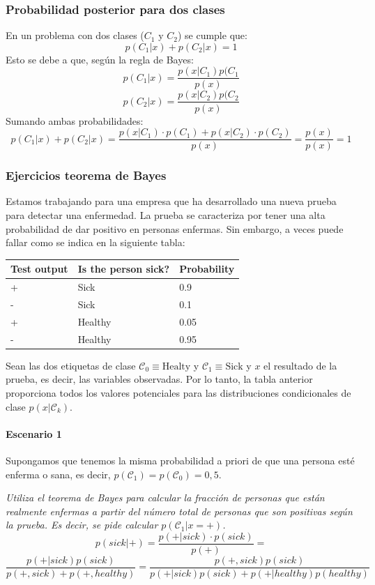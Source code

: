 \subsubsection{Probabilidad posterior para dos clases}
En un problema con dos clases ($C_1$ y $C_2$) se cumple que:
$$p(C_1|x) + p(C_2|x) = 1$$
Esto se debe a que, según la regla de Bayes:
$$p(C_1|x) = \frac{p(x|C_1) p(C_1}{p(x)}$$
$$p(C_2|x) = \frac{p(x|C_2) p(C_2}{p(x)}$$
Sumando ambas probabilidades:
$$p(C_1|x) + p(C_2|x) = \frac{p(x|C_1) \cdot p(C_1) + p(x|C_2) \cdot p(C_2)}{p(x)} = \frac{p(x)}{p(x)} = 1$$

\subsubsection{Ejercicios teorema de Bayes}
Estamos trabajando para una empresa que ha desarrollado una nueva prueba para detectar una enfermedad. La prueba se caracteriza por tener una alta probabilidad de dar positivo en personas enfermas. Sin embargo, a veces puede fallar como se indica en la siguiente tabla:

\begin{table}[h]
    \centering
    \begin{tabular}{|l|l|l|}
    \hline
        Test output & Is the person sick? & Probability \\ \hline
        + & Sick & 0.9 \\ \hline
        - & Sick & 0.1 \\ \hline
        + & Healthy & 0.05 \\ \hline
        - & Healthy & 0.95 \\ \hline
    \end{tabular}
\end{table}

Sean las dos etiquetas de clase $\mathcal{C}_0 \equiv \text{Healty}$ y $\mathcal{C}_1 \equiv \text{Sick}$ y $x$ el resultado de la prueba, es decir, las variables observadas. Por lo tanto, la tabla anterior proporciona todos los valores potenciales para las distribuciones condicionales de clase $p(x|\mathcal{C}_k)$.

\paragraph{Escenario 1} 
Supongamos que tenemos la misma probabilidad a priori de que una persona esté enferma o sana, es decir, $p(\mathcal{C}_1)=p(\mathcal{C}_0)=0,5$. 

\textit{Utiliza el teorema de Bayes para calcular la fracción de personas que están realmente enfermas a partir del número total de personas que son positivas según la prueba. Es decir, se pide calcular $p(\mathcal{C}_1|x=+)$.}
$$p(sick|+) = \frac{p(+|sick) \cdot p(sick)}{p(+)} =$$
$$ \frac{p(+|sick) p(sick)}{p(+, sick) + p(+, healthy)} = \frac{p(+, sick) p(sick)}{p(+|sick)p(sick) + p(+|healthy) p(healthy)}$$

